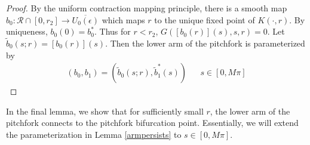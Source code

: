\documentclass[thesis.tex]{subfiles}
\begin{document}
\begin{lemma}
\begin{proof}
By the uniform contraction mapping principle, there is a smooth map $b_0 : \mathcal{R} \cap [0, r_2] \rightarrow  \overline{U_0(\epsilon)}$ which maps $r$ to the unique fixed point of $K(\cdot, r)$. By uniqueness, $b_0(0) = b_0^*$. Thus for $r < r_2$, $G([b_0(r)](s), s, r) = 0$. Let $\tilde{b}_0(s; r) = [b_0(r)](s)$. Then the lower arm of the pitchfork is parameterized by
\begin{align*}
(b_0, b_1) = (\tilde{b}_0(s; r), \tilde{b}^*_1(s)) && s \in [0, M \pi]
\end{align*}

\end{proof}
\end{lemma} 

In the final lemma, we show that for sufficiently small $r$, the lower arm of the pitchfork connects to the pitchfork bifurcation point. Essentially, we will extend the parameterization in Lemma \ref{armpersists} to $s \in [0, M \pi]$.
\end{document}
